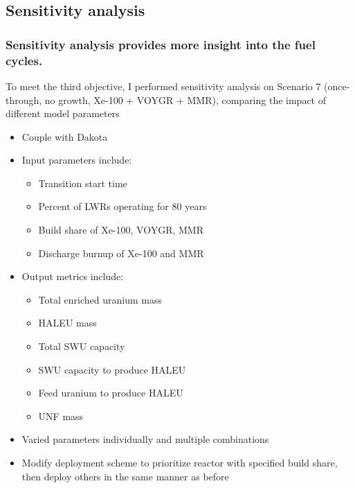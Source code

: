 \subsection{Sensitivity analysis}
\begin{frame}
    \frametitle{Sensitivity analysis provides more insight into 
    the fuel cycles.}
    To meet the third objective, I performed sensitivity analysis 
    on Scenario 7 (once-through, no growth, Xe-100 + VOYGR + MMR), 
    comparing the impact of different model parameters
    \begin{itemize}
        \item Couple \Cyclus with Dakota \cite{adams_dakota_2021}
        \item<2-> Input parameters include:
        \begin{itemize}
            \item<2-> Transition start time
            \item<2-> Percent of \glspl{LWR} operating for 80 years
            \item<2-> Build share of Xe-100, VOYGR, MMR
            \item<2-> Discharge burnup of Xe-100 and MMR
        \end{itemize}
        \item<3-> Output metrics include:
        \begin{itemize}
            \item<3-> Total enriched uranium mass
            \item<3-> HALEU mass
            \item<3-> Total SWU capacity
            \item<3-> SWU capacity to produce HALEU
            \item<3-> Feed uranium to produce HALEU
            \item<3-> \gls{UNF} mass
        \end{itemize}
        \item<4-> Varied parameters individually and multiple combinations
        \item<4-> Modify deployment scheme to prioritize reactor with 
              specified build share, then deploy others in the same 
              manner as before
    \end{itemize}

\end{frame}

